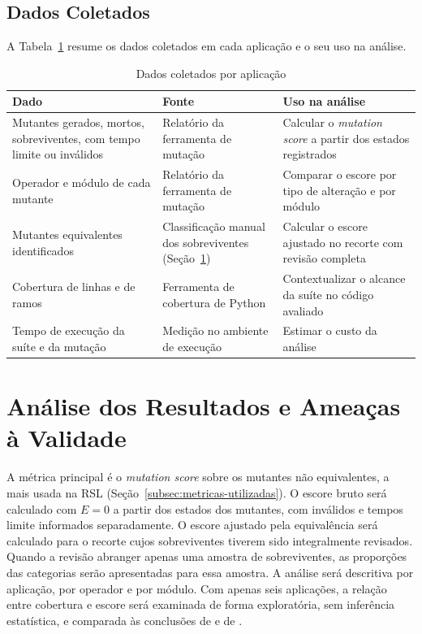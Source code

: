 \subsection{Dados Coletados}
\label{subsec:dados-coletados}

A Tabela~\ref{quad:dados-coletados} resume os dados coletados em cada aplicação e o seu uso na análise.

\begin{table}[htb]
    \centering
    \caption{Dados coletados por aplicação}
    \label{quad:dados-coletados}
    \begin{tabular}{p{4.5cm}p{4.5cm}p{5.5cm}}
        \toprule
        \textbf{Dado} & \textbf{Fonte} & \textbf{Uso na análise} \\
        \midrule
        Mutantes gerados, mortos, sobreviventes, com tempo limite ou inválidos & Relatório da ferramenta de mutação & Calcular o \textit{mutation score} a partir dos estados registrados \\
        Operador e módulo de cada mutante & Relatório da ferramenta de mutação & Comparar o escore por tipo de alteração e por módulo \\
        Mutantes equivalentes identificados & Classificação manual dos sobreviventes (Seção~\ref{sec:analise-validade}) & Calcular o escore ajustado no recorte com revisão completa \\
        Cobertura de linhas e de ramos & Ferramenta de cobertura de Python & Contextualizar o alcance da suíte no código avaliado \\
        Tempo de execução da suíte e da mutação & Medição no ambiente de execução & Estimar o custo da análise \\
        \bottomrule
    \end{tabular}
\end{table}

\section{Análise dos Resultados e Ameaças à Validade}
\label{sec:analise-validade}

A métrica principal é o \textit{mutation score} sobre os mutantes não equivalentes, a mais usada na RSL (Seção~\ref{subsec:metricas-utilizadas}). O escore bruto será calculado com $E = 0$ a partir dos estados dos mutantes, com inválidos e tempos limite informados separadamente. O escore ajustado pela equivalência será calculado para o recorte cujos sobreviventes tiverem sido integralmente revisados. Quando a revisão abranger apenas uma amostra de sobreviventes, as proporções das categorias serão apresentadas para essa amostra. A análise será descritiva por aplicação, por operador e por módulo. Com apenas seis aplicações, a relação entre cobertura e escore será examinada de forma exploratória, sem inferência estatística, e comparada às conclusões de  e de .

